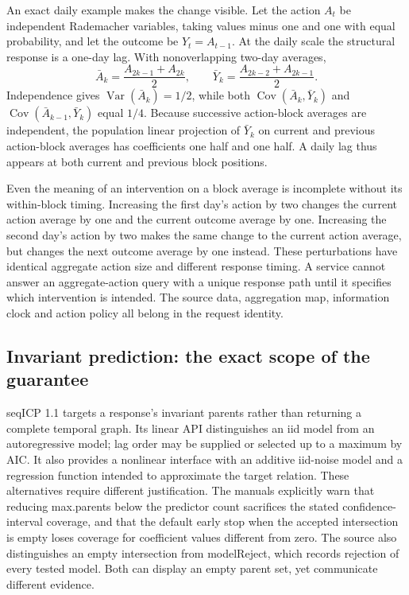 An exact daily example makes the change visible. Let the action \(A_t\) be
independent Rademacher variables, taking values minus one and one with equal
probability, and let the outcome be \(Y_t=A_{t-1}\). At the daily scale the
structural response is a one-day lag. With nonoverlapping two-day averages,
\[
 \bar A_k=\frac{A_{2k-1}+A_{2k}}2,
 \qquad
 \bar Y_k=\frac{A_{2k-2}+A_{2k-1}}2.
\]
Independence gives \(\operatorname{Var}(\bar A_k)=1/2\), while both
\(\operatorname{Cov}(\bar A_k,\bar Y_k)\) and
\(\operatorname{Cov}(\bar A_{k-1},\bar Y_k)\) equal \(1/4\).
Because successive action-block averages are independent, the population linear
projection of \(\bar Y_k\) on current and previous action-block averages has
coefficients one half and one half. A daily lag thus appears at both current
and previous block positions. \citep{exec14_rtime_exact}

Even the meaning of an intervention on a block average is incomplete without
its within-block timing. Increasing the first day's action by two changes the
current action average by one and the current outcome average by one. Increasing
the second day's action by two makes the same change to the current action
average, but changes the next outcome average by one instead. These perturbations
have identical aggregate action size and different response timing. A service
cannot answer an aggregate-action query with a unique response path until it
specifies which intervention is intended. The source data, aggregation map,
information clock and action policy all belong in the request identity.
\citep{exec14_rtime_exact}

\subsection{Invariant prediction: the exact scope of the guarantee}

seqICP 1.1 targets a response's invariant parents rather than returning a complete
temporal graph. Its linear API distinguishes an iid model from an autoregressive
model; lag order may be supplied or selected up to a maximum by AIC. It also
provides a nonlinear interface with an additive iid-noise model and a regression
function intended to approximate the target relation. These alternatives require
different justification. The manuals explicitly warn that reducing max.parents
below the predictor count sacrifices the stated confidence-interval coverage,
and that the default early stop when the accepted intersection is empty loses
coverage for coefficient values different from zero. The source also distinguishes
an empty intersection from modelReject, which records rejection of every tested
model. Both can display an empty parent set, yet communicate different evidence.
\citep{exec14_rtime_seqicp}

